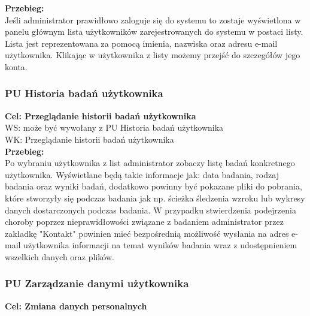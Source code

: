 \documentclass[12pt, letterpaper]{article}
\begin{document}
		\textbf{Przebieg:}\\
		Jeśli administrator prawidłowo zaloguje się do systemu to zostaje wyświetlona w panelu głównym lista użytkowników zarejestrowanych do systemu w postaci listy. Lista jest reprezentowana za pomocą imienia, nazwiska oraz adresu e-mail użytkownika. Klikając w użytkownika z listy możemy przejść do szczegółów jego konta.\\	
		
		
		\subsubsection{PU Historia badań użytkownika}
		
		\quad
		
		\textbf{Cel: Przeglądanie historii badań użytkownika}\\
		
		WS: może być wywołany z PU Historia badań użytkownika\\
		
		WK: Przeglądanie historii badań użytkownika \\
		
		\textbf{Przebieg:}\\
		Po wybraniu użytkownika z list administrator zobaczy listę badań konkretnego użytkownika. Wyświetlane będą takie informacje jak: data badania, rodzaj badania oraz wyniki badań, dodatkowo powinny być pokazane pliki do pobrania, które stworzyły się podczas badania jak np. ścieżka śledzenia wzroku lub wykresy danych dostarczonych podczas badania. W przypadku stwierdzenia podejrzenia choroby poprzez nieprawidłowości związane z badaniem administrator przez zakładkę "Kontakt" powinien mieć bezpośrednią możliwość wysłania na adres e-mail użytkownika informacji na temat wyników badania wraz z udostępnieniem wszelkich danych oraz plików.
		
		
		\subsubsection{PU Zarządzanie danymi użytkownika}
		
		\quad
		
		\textbf{Cel: Zmiana danych personalnych}\\
		
\end{document}
